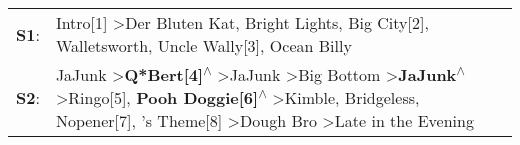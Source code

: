 \begin{supertabular}{p{0.03\textwidth}p{0.92\textwidth}}
 \textbf{S1}:  &                                                                                                                                                                                                                                                                                                                                                                                             Intro[1]\textsuperscript{} \textgreater \enspace Der Bluten Kat\textsuperscript{}, \enspace Bright Lights, Big City[2]\textsuperscript{}, \enspace Walletsworth\textsuperscript{}, \enspace Uncle Wally[3]\textsuperscript{}, \enspace Ocean Billy\textsuperscript{}  \enspace  \\
 \textbf{S2}:  &  JaJunk\textsuperscript{} \textgreater \enspace \textbf{Q*Bert[4]\textsuperscript{$\wedge$}} \textgreater \enspace JaJunk\textsuperscript{} \textgreater \enspace Big Bottom\textsuperscript{} \textgreater \enspace \textbf{JaJunk\textsuperscript{$\wedge$}} \textgreater \enspace Ringo[5]\textsuperscript{}, \enspace \textbf{Pooh Doggie[6]\textsuperscript{$\wedge$}} \textgreater \enspace Kimble\textsuperscript{}, \enspace Bridgeless\textsuperscript{}, \enspace Nopener[7]\textsuperscript{}, 's Theme[8]\textsuperscript{} \textgreater \enspace Dough Bro\textsuperscript{} \textgreater \enspace Late in the Evening\textsuperscript{}  \enspace  \\
\end{supertabular}
